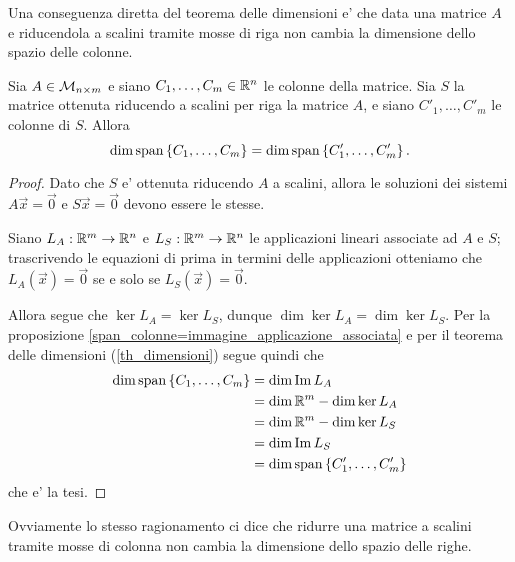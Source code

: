 Una conseguenza diretta del teorema delle dimensioni e' che data una matrice $A$ e riducendola a scalini tramite mosse di riga non cambia la dimensione dello spazio delle colonne.
\begin{proposition}\label{invarianza_dim_colonne_per_mosse_riga}
    Sia $A \in \mathcal{M}_{n\times m}$ e siano $C_1, \dots, C_m \in \mathbb{R}^n$ le colonne della matrice. Sia $S$ la matrice ottenuta riducendo a scalini per riga la matrice $A$, e siano $C'_1, \dots, C'_m$ le colonne di $S$. Allora \begin{equation}
        \dim \operatorname{span}\left\{C_1, \dots, C_m\right\} = \dim \operatorname{span}\left\{C'_1, \dots, C'_m\right\}.
    \end{equation}
\end{proposition}
\begin{proof}
    Dato che $S$ e' ottenuta riducendo $A$ a scalini, allora le soluzioni dei sistemi $A\vec{x} = \vec 0$ e $S\vec{x} = \vec 0$ devono essere le stesse. 
    
    Siano $L_A : \mathbb{R}^m \to \mathbb{R}^n$ e $L_S : \mathbb{R}^m \to \mathbb{R}^n$ le applicazioni lineari associate ad $A$ e $S$; trascrivendo le equazioni di prima in termini delle applicazioni otteniamo che $L_A(\vec x) = \vec 0$ se e solo se $L_S(\vec x) = \vec 0$. 
    
    Allora segue che $\ker L_A = \ker L_S$, dunque $\dim \ker L_A = \dim \ker L_S$. Per la proposizione \ref{span_colonne=immagine_applicazione_associata} e per il teorema delle dimensioni (\ref{th_dimensioni}) segue quindi che
    \begin{alignat*}
        {1}
        \dim \operatorname{span}\left\{C_1, \dots, C_m\right\} &= \dim \operatorname{Im}L_A\\
        &= \dim \mathbb{R}^m - \dim \ker L_A\\
        &= \dim \mathbb{R}^m - \dim \ker L_S\\
        &= \dim \operatorname{Im}L_S \\
        &= \dim \operatorname{span}\left\{C'_1, \dots, C'_m\right\}
    \end{alignat*}
    che e' la tesi.
\end{proof}

Ovviamente lo stesso ragionamento ci dice che ridurre una matrice a scalini tramite mosse di colonna non cambia la dimensione dello spazio delle righe.


